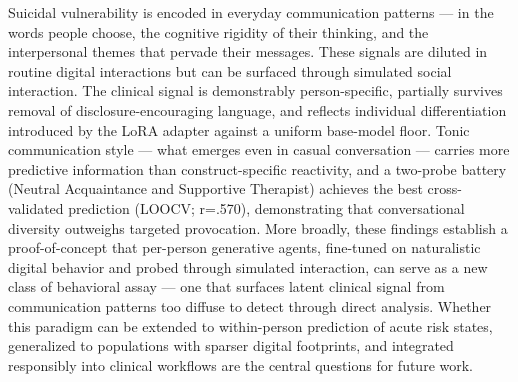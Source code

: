 \documentclass[review,12pt,authoryear]{elsarticle}
\begin{document}
Suicidal vulnerability is encoded in everyday communication patterns — in the words people choose, the cognitive rigidity of their thinking, and the interpersonal themes that pervade their messages. These signals are diluted in routine digital interactions but can be surfaced through simulated social interaction. The clinical signal is demonstrably person-specific, partially survives removal of disclosure-encouraging language, and reflects individual differentiation introduced by the LoRA adapter against a uniform base-model floor. Tonic communication style — what emerges even in casual conversation — carries more predictive information than construct-specific reactivity, and a two-probe battery (Neutral Acquaintance and Supportive Therapist) achieves the best cross-validated prediction (LOOCV; r=.570), demonstrating that conversational diversity outweighs targeted provocation. More broadly, these findings establish a proof-of-concept that per-person generative agents, fine-tuned on naturalistic digital behavior and probed through simulated interaction, can serve as a new class of behavioral assay — one that surfaces latent clinical signal from communication patterns too diffuse to detect through direct analysis. Whether this paradigm can be extended to within-person prediction of acute risk states, generalized to populations with sparser digital footprints, and integrated responsibly into clinical workflows are the central questions for future work.
\end{document}
